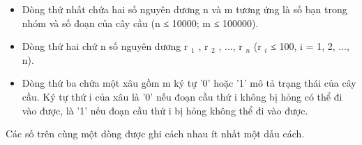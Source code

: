 \begin{itemize}
	\item Dòng thứ nhất chứa hai số nguyên dương n và m tương ứng là số bạn trong nhóm và số đoạn của cây cầu (n ≤ 10000; m ≤ 100000).
	\item Dòng thứ hai chứ n số nguyên dương r $_ 1 $ , r $_ 2 $ , ..., r $_ n $ (r $_ i $ ≤ 100, i = 1, 2, ..., n).
	\item Dòng thứ ba chứa một xâu gồm m ký tự '0' hoặc '1' mô tả trạng thái của cây cầu. Ký tự thứ i của xâu là '0' nếu đoạn cầu thứ i không bị hỏng có thể đi vào được, là '1' nếu đoạn cầu thứ i bị hỏng không thể đi vào được.
\end{itemize}

Các số trên cùng một dòng được ghi cách nhau ít nhất một dấu cách.